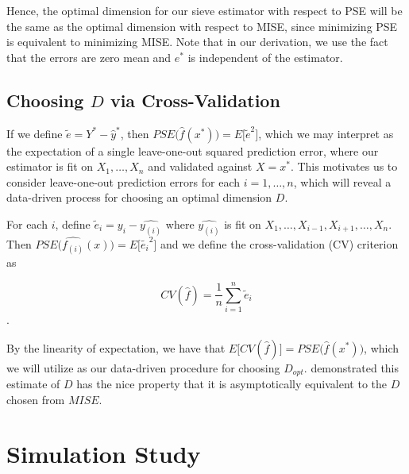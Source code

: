 \documentclass[12pt]{article}  %
\begin{document}
Hence, the optimal dimension for our sieve estimator with respect to PSE will be the same as the optimal dimension with respect to MISE, since minimizing PSE is equivalent to minimizing MISE. Note that in our derivation, we use the fact that the errors are zero mean and $e^*$ is independent of the estimator. 

\subsection{Choosing $D$ via Cross-Validation}

If we define $\tilde{e} = Y^* - \hat{y}^*$, then $PSE\Big(\hat{f}(x^*)\Big) = E\big[\tilde{e}^2\big]$, which we may interpret as the expectation of a single leave-one-out squared prediction error, where our estimator is fit on $X_1, \ldots, X_n$ and validated against $X = x^*$. This motivates us to consider leave-one-out prediction errors for each $i = 1, \ldots, n$, which will reveal a data-driven process for choosing an optimal dimension $D$.

For each $i$, define $\tilde{e}_i = y_i - \hat{y_{(i)}}$ where $\hat{y_{(i)}}$ is fit on $X_1, \ldots, X_{i-1}, X_{i+1}, \ldots, X_n$. Then $PSE\Big(\hat{f_{(i)}}(x)\Big) = E\big[\tilde{e_i}^2\big]$ and we define the cross-validation (CV) criterion as

$$CV(\hat{f}) = \frac{1}{n}\sum_{i=1}^n \tilde{e}_i$$.

By the linearity of expectation, we have that $E\Big[CV(\hat{f})\Big] = PSE\Big(\hat{f}(x^*)\Big)$, which we will utilize as our data-driven procedure for choosing $D_{opt}$. \cite{Hansen} demonstrated this estimate of $D$ has the nice property that it is asymptotically equivalent to the $D$ chosen from $MISE$.
\section{Simulation Study}
\end{document}
